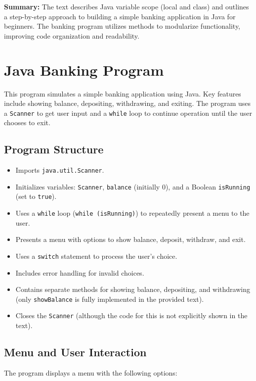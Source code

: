 \documentclass{article}
\begin{document}
\textbf{Summary:} The text describes Java variable scope (local and class) and outlines a step-by-step approach to building a simple banking application in Java for beginners.  The banking program utilizes methods to modularize functionality, improving code organization and readability.


\section{Java Banking Program}

This program simulates a simple banking application using Java.  Key features include showing balance, depositing, withdrawing, and exiting.  The program uses a \texttt{Scanner} to get user input and a \texttt{while} loop to continue operation until the user chooses to exit.

\subsection{Program Structure}

\begin{itemize}
    \item Imports \texttt{java.util.Scanner}.
    \item Initializes variables: \texttt{Scanner}, \texttt{balance} (initially 0), and a Boolean \texttt{isRunning} (set to \texttt{true}).
    \item Uses a \texttt{while} loop (\texttt{while (isRunning)}) to repeatedly present a menu to the user.
    \item Presents a menu with options to show balance, deposit, withdraw, and exit.
    \item Uses a \texttt{switch} statement to process the user's choice.
    \item Includes error handling for invalid choices.
    \item Contains separate methods for showing balance, depositing, and withdrawing (only \texttt{showBalance} is fully implemented in the provided text).
    \item Closes the \texttt{Scanner} (although the code for this is not explicitly shown in the text).
\end{itemize}

\subsection{Menu and User Interaction}

The program displays a menu with the following options:
\end{document}
